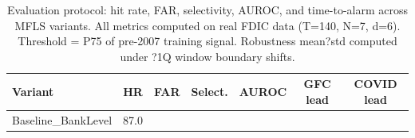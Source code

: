 \begin{table}[htbp]
\centering
\caption{Evaluation protocol: hit rate, FAR, selectivity, AUROC, and time-to-alarm across MFLS variants. All metrics computed on real FDIC data (T=140, N=7, d=6). Threshold = P75 of pre-2007 training signal. Robustness mean?std computed under ?1Q window boundary shifts.}
\label{tab:eval_protocol}
\begin{tabular}{lcccccc}
\toprule
Variant & HR & FAR & Select. & AUROC & GFC lead & COVID lead \\
\midrule
Baseline_BankLevel & 87.0%
\bottomrule
\end{tabular}
\end{table}
